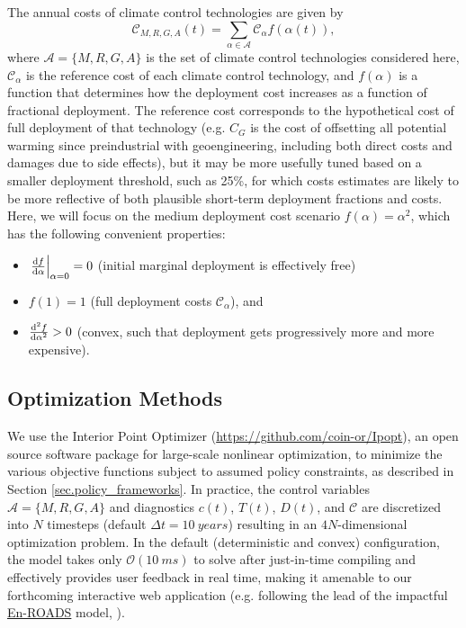 \documentclass{article}
\begin{document}
The annual costs of climate control technologies are given by
\begin{equation}
    \mathcal{C}_{M, R, G, A}(t) = \sum_{\alpha \in \mathcal{A}} \mathcal{C}_{\alpha} f(\alpha(t)),
\end{equation}
where $\mathcal{A} = \{M, R, G, A \}$ is the set of climate control technologies considered here, $\mathcal{C}_{\alpha}$ is the reference cost of each climate control technology, and $f(\alpha)$ is a function that determines how the deployment cost increases as a function of fractional deployment. The reference cost corresponds to the hypothetical cost of full deployment of that technology (e.g. $C_{G}$ is the cost of offsetting all potential warming since preindustrial with geoengineering, including both direct costs and damages due to side effects), but it may be more usefully tuned based on a smaller deployment threshold, such as 25\%, for which costs estimates are likely to be more reflective of both plausible short-term deployment fractions and costs. Here, we will focus on the medium deployment cost scenario $f(\alpha) = \alpha^{2}$, which has the following convenient properties: 
\begin{itemize}
    \item $\left. \dv{f}{\alpha}\right|_{\alpha=0} = 0$ (initial marginal deployment is effectively free)
    \item $f(1) = 1$ (full deployment costs $\mathcal{C}_{\alpha}$), and
    \item $\dv[2]{f}{\alpha} > 0$ (convex, such that deployment gets progressively more and more expensive).
\end{itemize}

\subsection{Optimization Methods}

We use the Interior Point Optimizer (\href{https://github.com/coin-or/Ipopt}{https://github.com/coin-or/Ipopt}), an open source software package for large-scale nonlinear optimization, to minimize the various objective functions subject to assumed policy constraints, as described in Section \ref{sec.policy_frameworks}. In practice, the control variables $\mathcal{A} = \{ M, R, G, A\}$ and diagnostics $c(t)$, $T(t)$, $D(t)$, and $\mathcal{C}$ are discretized into $N$ timesteps (default $\Delta t = \SI{10}{years}$) resulting in an $4N$-dimensional optimization problem. In the default (deterministic and convex) configuration, the model takes only $\mathcal{O}(\SI{10}{ms})$ to solve after just-in-time compiling and effectively provides user feedback in real time, making it amenable to our forthcoming interactive web application (e.g. following the lead of the impactful \href{https://en-roads.climateinteractive.org/scenario.html?v=2.7.11}{En-ROADS} model, \citealt{siegel2018roads}).
\end{document}
